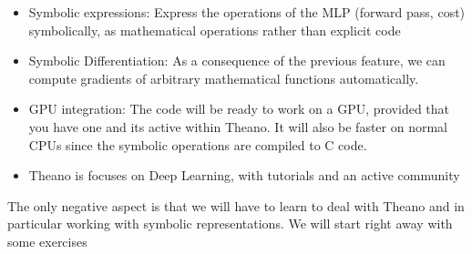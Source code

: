\begin{itemize}
\item Symbolic expressions: Express the operations of the MLP (forward pass, cost) symbolically, as mathematical operations rather than explicit code 
\item Symbolic Differentiation: As a consequence of the previous feature, we can compute gradients of arbitrary mathematical functions automatically.   
\item GPU integration: The code will be ready to work on a GPU, provided that you have one and its active within Theano. It will also be faster on normal CPUs since the symbolic operations are compiled to C code. 
\item Theano is focuses on Deep Learning, with tutorials and an active community   
\end{itemize}

The only negative aspect is that we will have to learn to deal with Theano and
in particular working with symbolic representations. We will start right away
with some exercises

